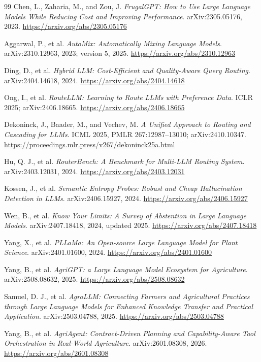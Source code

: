 \documentclass[10pt,a4paper,twocolumn]{article}
\begin{document}
\begin{thebibliography}{99}
\small
{}Chen, L., Zaharia, M., and Zou, J. \emph{FrugalGPT: How to Use Large Language Models While Reducing Cost and Improving Performance}. arXiv:2305.05176, 2023. \url{https://arxiv.org/abs/2305.05176}

Aggarwal, P., et al. \emph{AutoMix: Automatically Mixing Language Models}. arXiv:2310.12963, 2023; version 5, 2025. \url{https://arxiv.org/abs/2310.12963}

Ding, D., et al. \emph{Hybrid LLM: Cost-Efficient and Quality-Aware Query Routing}. arXiv:2404.14618, 2024. \url{https://arxiv.org/abs/2404.14618}

Ong, I., et al. \emph{RouteLLM: Learning to Route LLMs with Preference Data}. ICLR 2025; arXiv:2406.18665. \url{https://arxiv.org/abs/2406.18665}

Dekoninck, J., Baader, M., and Vechev, M. \emph{A Unified Approach to Routing and Cascading for LLMs}. ICML 2025, PMLR 267:12987--13010; arXiv:2410.10347. \url{https://proceedings.mlr.press/v267/dekoninck25a.html}

Hu, Q. J., et al. \emph{RouterBench: A Benchmark for Multi-LLM Routing System}. arXiv:2403.12031, 2024. \url{https://arxiv.org/abs/2403.12031}

Kossen, J., et al. \emph{Semantic Entropy Probes: Robust and Cheap Hallucination Detection in LLMs}. arXiv:2406.15927, 2024. \url{https://arxiv.org/abs/2406.15927}

Wen, B., et al. \emph{Know Your Limits: A Survey of Abstention in Large Language Models}. arXiv:2407.18418, 2024, updated 2025. \url{https://arxiv.org/abs/2407.18418}

Yang, X., et al. \emph{PLLaMa: An Open-source Large Language Model for Plant Science}. arXiv:2401.01600, 2024. \url{https://arxiv.org/abs/2401.01600}

Yang, B., et al. \emph{AgriGPT: a Large Language Model Ecosystem for Agriculture}. arXiv:2508.08632, 2025. \url{https://arxiv.org/abs/2508.08632}

Samuel, D. J., et al. \emph{AgroLLM: Connecting Farmers and Agricultural Practices through Large Language Models for Enhanced Knowledge Transfer and Practical Application}. arXiv:2503.04788, 2025. \url{https://arxiv.org/abs/2503.04788}

Yang, B., et al. \emph{AgriAgent: Contract-Driven Planning and Capability-Aware Tool Orchestration in Real-World Agriculture}. arXiv:2601.08308, 2026. \url{https://arxiv.org/abs/2601.08308}


\end{thebibliography}
\end{document}
